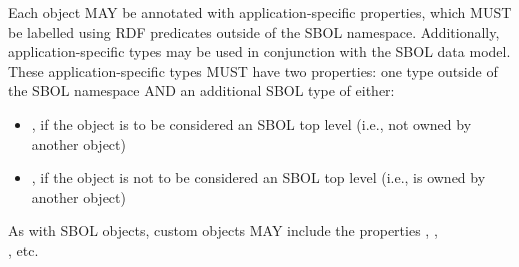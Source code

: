 Each  object MAY be annotated with application-specific properties, which MUST be labelled using RDF predicates outside of the SBOL namespace.  Additionally, application-specific types may be used in conjunction with the SBOL data model. These application-specific types MUST have two  properties: one type outside of the SBOL namespace AND an additional SBOL type of either:

\begin{itemize}
  \item {}, if the object is to be considered an SBOL top level (i.e., not owned by another object)
  \item {}, if the object is not to be considered an SBOL top level (i.e., is owned by another object)
\end{itemize}

As with SBOL  objects, custom  objects MAY include the properties , ,\\ , etc. 
